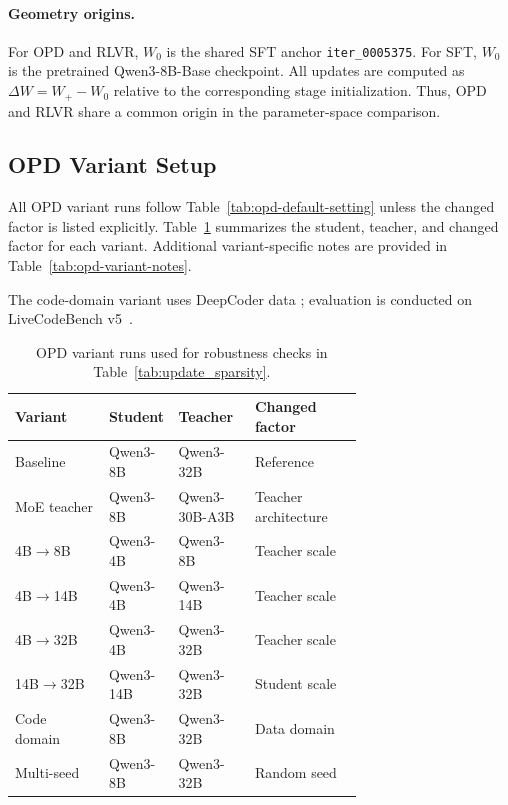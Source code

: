 \documentclass{llmxive}
\providecommand{\arraystretch}{1.05}
\begin{document}
\paragraph{Geometry origins.}
For OPD and RLVR, $W_0$ is the shared SFT anchor
\texttt{iter\_0005375}. For SFT, $W_0$ is the pretrained Qwen3-8B-Base
checkpoint. All updates are computed as $\Delta W = W_+ - W_0$ relative to
the corresponding stage initialization. Thus, OPD and RLVR share a common
origin in the parameter-space comparison.

\subsection{OPD Variant Setup}
\label{app:opd-variants}

All OPD variant runs follow Table~\ref{tab:opd-default-setting} unless the
changed factor is listed explicitly. Table~\ref{tab:opd-variants}
summarizes the student, teacher, and changed factor for each variant. Additional variant-specific notes are provided in
Table~\ref{tab:opd-variant-notes}.

The code-domain variant uses DeepCoder data \cite{deepcoder2025};
evaluation is conducted on LiveCodeBench v5~\cite{jain2024livecodebenchholisticcontaminationfree}.

\begin{table}[t]
\centering
\small
\setlength{\tabcolsep}{3.5pt}
\renewcommand{\arraystretch}{1.08}
\begin{tabularx}{\linewidth}{@{}p{0.27\linewidth}p{0.20\linewidth}p{0.22\linewidth}X@{}}
\toprule
\textbf{Variant} & \textbf{Student} & \textbf{Teacher} & \textbf{Changed factor} \\
\midrule
Baseline & Qwen3-8B & Qwen3-32B & Reference \\
MoE teacher & Qwen3-8B & Qwen3-30B-A3B & Teacher architecture \\
4B$\rightarrow$8B & Qwen3-4B & Qwen3-8B & Teacher scale \\
4B$\rightarrow$14B & Qwen3-4B & Qwen3-14B & Teacher scale \\
4B$\rightarrow$32B & Qwen3-4B & Qwen3-32B & Teacher scale \\
14B$\rightarrow$32B & Qwen3-14B & Qwen3-32B & Student scale \\
Code domain & Qwen3-8B & Qwen3-32B & Data domain \\
Multi-seed & Qwen3-8B & Qwen3-32B & Random seed \\
\bottomrule
\end{tabularx}
\caption{
OPD variant runs used for robustness checks in
Table~\ref{tab:update_sparsity}.
}
\label{tab:opd-variants}
\end{table}
\end{document}
